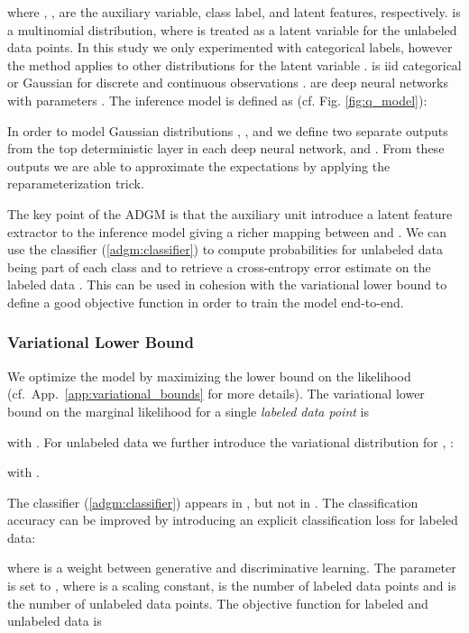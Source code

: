 \documentclass{article}
\begin{document}
where , ,  are the auxiliary variable, class label, and latent features, respectively.  is a multinomial distribution, where  is treated as a latent variable for the unlabeled data points. In this study we only experimented with categorical labels, however the method applies to other distributions for the latent variable .  is iid categorical or Gaussian for discrete and continuous observations .  are deep neural networks with parameters . The inference model is defined as  (cf. Fig. \ref{fig:q_model}): 

In order to model Gaussian distributions , ,  and  we define two separate outputs from the top deterministic layer in each deep neural network,  and . From these outputs we are able to approximate the expectations  by applying the reparameterization trick.

The key point of the ADGM is that the auxiliary unit  introduce a latent feature extractor to the inference model giving a richer mapping between  and . We can use the classifier (\ref{adgm:classifier}) to compute probabilities for unlabeled data  being part of each class and to retrieve a cross-entropy error estimate on the labeled data . This can be used in cohesion with the variational lower bound to define a good objective function in order to train the model end-to-end.

\subsubsection*{Variational Lower Bound}
We optimize the model by maximizing the lower bound on the likelihood (cf.~App.~\ref{app:variational_bounds} for more details). The variational lower bound on the marginal likelihood for a single \emph{labeled data point} is

with .
For unlabeled data we further introduce the variational distribution for , :

with .

The classifier (\ref{adgm:classifier}) appears in , but not in . The classification accuracy can be improved by introducing an explicit classification loss for labeled data:
 
where  is a weight between generative and discriminative learning. The  parameter is set to , where  is a scaling constant,  is the number of labeled data points and  is the number of unlabeled data points. The objective function for labeled and unlabeled data is
\end{document}
